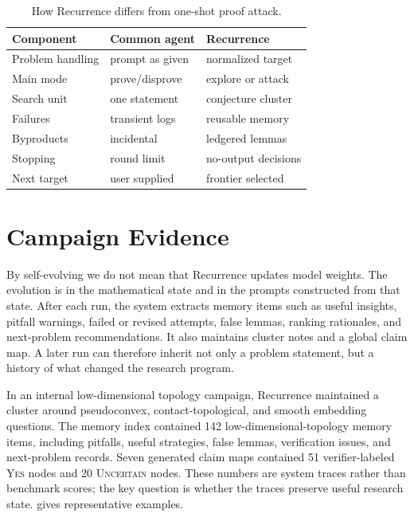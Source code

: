 \documentclass{article}
\theoremstyle{definition}
\theoremstyle{remark}
\begin{document}
\begin{table}[t]
  \caption{How Recurrence differs from one-shot proof attack.}
  \label{tab:comparison}
  \vskip 0.08in
  \centering
  \begin{footnotesize}
  \setlength{\tabcolsep}{3pt}
  \begin{tabular}{p{}p{}p{}}
    \toprule
    Component & Common agent & Recurrence \\
    \midrule
    Problem handling & prompt as given & normalized target \\
    Main mode & prove/disprove & explore or attack \\
    Search unit & one statement & conjecture cluster \\
    Failures & transient logs & reusable memory \\
    Byproducts & incidental & ledgered lemmas \\
    Stopping & round limit & no-output decisions \\
    Next target & user supplied & frontier selected \\
    \bottomrule
  \end{tabular}
  \end{footnotesize}
\end{table}

\section{Campaign Evidence}

By self-evolving we do not mean that Recurrence updates model weights. The evolution is in the mathematical state and in the prompts constructed from that state. After each run, the system extracts memory items such as useful insights, pitfall warnings, failed or revised attempts, false lemmas, ranking rationales, and next-problem recommendations. It also maintains cluster notes and a global claim map. A later run can therefore inherit not only a problem statement, but a history of what changed the research program.

In an internal low-dimensional topology campaign, Recurrence maintained a cluster around pseudoconvex, contact-topological, and smooth embedding questions. The memory index contained 142 low-dimensional-topology memory items, including pitfalls, useful strategies, false lemmas, verification issues, and next-problem records. Seven generated claim maps contained 51 verifier-labeled \textsc{Yes} nodes and 20 \textsc{Uncertain} nodes. These numbers are system traces rather than benchmark scores; the key question is whether the traces preserve useful research state.  gives representative examples.
\end{document}

